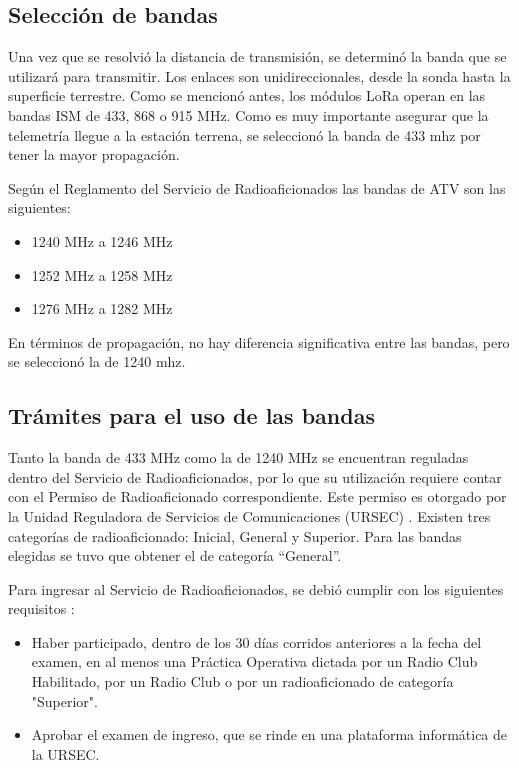 \documentclass[12pt,a4paper]{article}
\begin{document}
\subsection{Selección de bandas}\label{banda}

Una vez que se resolvió la distancia de transmisión, se determinó la banda que se utilizará para transmitir. Los enlaces son unidireccionales, desde la sonda hasta la superficie terrestre. Como se mencionó antes, los módulos LoRa operan en las bandas ISM de 433, 868 o 915 MHz. Como es muy importante asegurar que la telemetría llegue a la estación terrena, se seleccionó la banda de 433 mhz por tener la mayor propagación.

Según el Reglamento del Servicio de Radioaficionados \cite{ref41} las bandas de ATV son las siguientes:

\begin{itemize}
\item
  1240 MHz a 1246 MHz
\item
  1252 MHz a 1258 MHz
\item
  1276 MHz a 1282 MHz
\end{itemize}

En términos de propagación, no hay diferencia significativa entre las bandas, pero se seleccionó la de 1240 mhz.

\subsection{Trámites para el uso de las bandas}\label{truxe1mites-para-el-uso-de-las-bandas}

Tanto la banda de 433 MHz como la de 1240 MHz se encuentran reguladas dentro del Servicio de Radioaficionados, por lo que su utilización requiere contar con el Permiso de Radioaficionado correspondiente. Este permiso es otorgado por la Unidad Reguladora de Servicios de Comunicaciones (URSEC) \cite{ref41}. Existen tres categorías de radioaficionado: Inicial, General y Superior. Para las bandas elegidas se tuvo que obtener el de categoría ``General''.

Para ingresar al Servicio de Radioaficionados, se debió cumplir con los siguientes requisitos \cite{ref65}:

\begin{itemize}
\item
  Haber participado, dentro de los 30 días corridos anteriores a la fecha del examen, en al menos una Práctica Operativa dictada por un Radio Club Habilitado, por un Radio Club o por un radioaficionado de categoría "Superior".
\item
  Aprobar el examen de ingreso, que se rinde en una plataforma informática de la URSEC.
\end{itemize}
\end{document}
